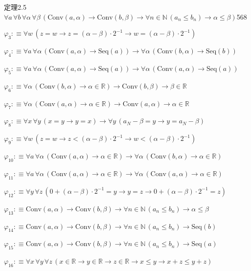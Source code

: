 \begin{fullproof}{定理2.5}{$\forall a\,\forall b\,\forall \alpha\,\forall \beta\,(\mathrm{Conv}(a,\alpha) \to \mathrm{Conv}(b,\beta) \to \forall n \in \mathbb{N}\,(a_{n} \leq b_{n}) \to \alpha \leq \beta)$}{568}
\begin{abbrevlist}
\item $\varphi_{3} :\equiv \forall w\,(z = w \to z = (\alpha - \beta) \cdot 2^{-1} \to w = (\alpha - \beta) \cdot 2^{-1})$
\item $\varphi_{4} :\equiv \forall a\,\forall \alpha\,(\mathrm{Conv}(a,\alpha) \to \mathrm{Seq}(a)) \to \forall \alpha\,(\mathrm{Conv}(b,\alpha) \to \mathrm{Seq}(b))$
\item $\varphi_{5} :\equiv \forall a\,\forall \alpha\,(\mathrm{Conv}(a,\alpha) \to \mathrm{Seq}(a)) \to \forall \alpha\,(\mathrm{Conv}(a,\alpha) \to \mathrm{Seq}(a))$
\item $\varphi_{6} :\equiv \forall \alpha\,(\mathrm{Conv}(b,\alpha) \to \alpha \in \mathbb{R}) \to \mathrm{Conv}(b,\beta) \to \beta \in \mathbb{R}$
\item $\varphi_{7} :\equiv \forall \alpha\,(\mathrm{Conv}(a,\alpha) \to \alpha \in \mathbb{R}) \to \mathrm{Conv}(a,\alpha) \to \alpha \in \mathbb{R}$
\item $\varphi_{8} :\equiv \forall x\,\forall y\,(x = y \to y = x) \to \forall y\,(a_{N} - \beta = y \to y = a_{N} - \beta)$
\item $\varphi_{9} :\equiv \forall w\,(z = w \to z < (\alpha - \beta) \cdot 2^{-1} \to w < (\alpha - \beta) \cdot 2^{-1})$
\item $\varphi_{10} :\equiv \forall a\,\forall \alpha\,(\mathrm{Conv}(a,\alpha) \to \alpha \in \mathbb{R}) \to \forall \alpha\,(\mathrm{Conv}(b,\alpha) \to \alpha \in \mathbb{R})$
\item $\varphi_{11} :\equiv \forall a\,\forall \alpha\,(\mathrm{Conv}(a,\alpha) \to \alpha \in \mathbb{R}) \to \forall \alpha\,(\mathrm{Conv}(a,\alpha) \to \alpha \in \mathbb{R})$
\item $\varphi_{12} :\equiv \forall y\,\forall z\,(0 + (\alpha - \beta) \cdot 2^{-1} = y \to y = z \to 0 + (\alpha - \beta) \cdot 2^{-1} = z)$
\item $\varphi_{13} :\equiv \mathrm{Conv}(a,\alpha) \to \mathrm{Conv}(b,\beta) \to \forall n \in \mathbb{N}\,(a_{n} \leq b_{n}) \to \alpha \leq \beta$
\item $\varphi_{14} :\equiv \mathrm{Conv}(a,\alpha) \to \mathrm{Conv}(b,\beta) \to \forall n \in \mathbb{N}\,(a_{n} \leq b_{n}) \to \mathrm{Seq}(b)$
\item $\varphi_{15} :\equiv \mathrm{Conv}(a,\alpha) \to \mathrm{Conv}(b,\beta) \to \forall n \in \mathbb{N}\,(a_{n} \leq b_{n}) \to \mathrm{Seq}(a)$
\item $\varphi_{16} :\equiv \forall x\,\forall y\,\forall z\,(x \in \mathbb{R} \to y \in \mathbb{R} \to z \in \mathbb{R} \to x \leq y \to x + z \leq y + z)$

\end{abbrevlist}
\end{fullproof}
